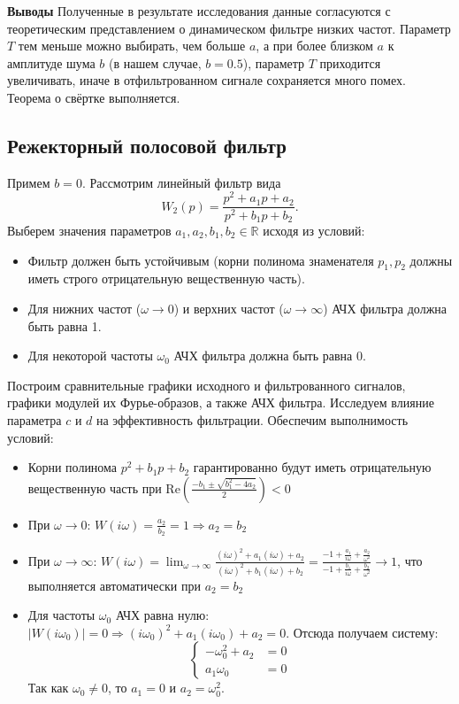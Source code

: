 \textbf{Выводы}
\newline
Полученные в результате исследования данные согласуются с теоретическим представлением о динамическом фильтре низких частот.
\newline
Параметр $T$ тем меньше можно выбирать, чем больше $a$, а при более близком $a$ к амплитуде шума $b$ (в нашем случае, $b=0.5$), параметр $T$ приходится увеличивать, иначе в отфильтрованном сигнале сохраняется много помех. Теорема о свёртке выполняется.

\subsection{Режекторный полосовой фильтр}
Примем $b = 0$. Рассмотрим линейный фильтр вида
$$
W_2(p) = \frac{p^2 + a_1 p + a_2}{p^2 + b_1 p + b_2}.
$$
Выберем значения параметров $a_1, a_2, b_1, b_2 \in \mathbb{R}$ исходя из условий:
\begin{itemize}
    \item Фильтр должен быть устойчивым (корни полинома знаменателя $p_1, p_2$ должны иметь строго отрицательную вещественную часть).
    \item Для нижних частот ($\omega \to 0$) и верхних частот ($\omega \to \infty$) АЧХ фильтра должна быть равна 1.
    \item Для некоторой частоты $\omega_0$ АЧХ фильтра должна быть равна 0.
\end{itemize}
Построим сравнительные графики исходного и фильтрованного сигналов, графики модулей их Фурье-образов, а также АЧХ фильтра. Исследуем влияние параметра $c$ и $d$ на эффективность фильтрации.\newline
Обеспечим выполнимость условий:
\begin{itemize}
    \item Корни полинома $p^2 + b_1 p + b_2$ гарантированно будут иметь отрицательную вещественную часть при $\text{Re}(\frac{-b_1\pm\sqrt{b_1^2-4a_2}}{2})<0$
    
    \item При $\omega \to 0$: $W(i\omega) = \frac{a_2}{b_2} = 1 \Rightarrow a_2 = b_2$
    
    \item При $\omega \to \infty$: $W(i\omega) = \lim_{\omega\to\infty} \frac{(i\omega)^2 + a_1(i\omega) + a_2}{(i\omega)^2 + b_1(i\omega) + b_2} = \frac{-1 + \frac{a_1}{i\omega} + \frac{a_2}{\omega^2}}{-1 + \frac{b_1}{i\omega} + \frac{b_2}{\omega^2}} \to 1$, что выполняется автоматически при $a_2 = b_2$
    
    \item Для частоты $\omega_0$ АЧХ равна нулю: $|W(i\omega_0)| = 0 \Rightarrow (i\omega_0)^2 + a_1(i\omega_0) + a_2 = 0$. Отсюда получаем систему:
  $$\begin{cases}
        -\omega_0^2 + a_2 &= 0\\
        a_1 \omega_0 &= 0
    \end{cases}$$
    Так как $\omega_0 \neq 0$, то $a_1 = 0$ и $a_2 = \omega_0^2$.
\end{itemize}

